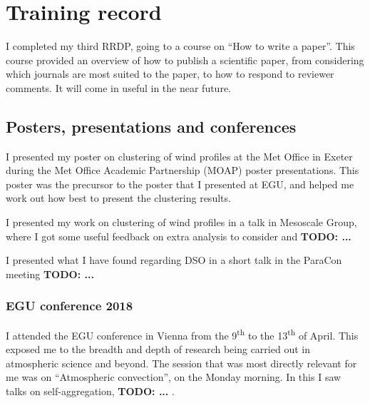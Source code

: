 \documentclass[11pt,a4paper]{article}
\newcommand{\ts}{\textsuperscript}
\newcommand\todo[1]{\textbf{TODO: #1}}
\begin{document}
\section{Training record}
\label{sec:Training record}

I completed my third RRDP, going to a course on ``How to write a paper''. This course provided an overview of how to publish a scientific paper, from considering which journals are most suited to the paper, to how to respond to reviewer comments. It will come in useful in the near future.

\subsection{Posters, presentations and conferences}
\label{sec:presentations}

I presented my poster on clustering of wind profiles at the Met Office in Exeter during the Met Office Academic Partnership (MOAP) poster presentations. This poster was the precursor to the poster that I presented at EGU, and helped me work out how best to present the clustering results.

I presented my work on clustering of wind profiles in a talk in Mesoscale Group, where I got some useful feedback on extra analysis to consider and \todo{...}

I presented what I have found regarding DSO in a short talk in the ParaCon meeting \todo{...}

\subsubsection{EGU conference 2018}

I attended the EGU conference in Vienna from the 9\ts{th} to the 13\ts{th} of April. This exposed me to the breadth and depth of research being carried out in atmospheric science and beyond. The session that was most directly relevant for me was on ``Atmospheric convection'', on the Monday morning. In this I saw talks on self-aggregation,  \todo{...} . 
\end{document}
